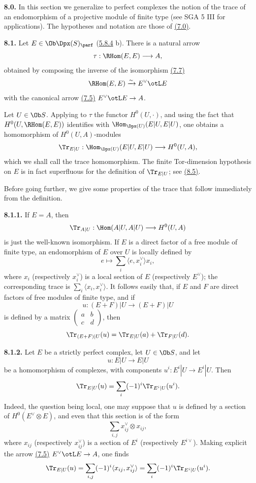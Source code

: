\textbf{8.0.} In this section we generalize to perfect complexes the notion of the trace of an endomorphism of a projective module of finite type (see SGA 5 III for applications). The hypotheses and notation are those of \hyperlink{sga6.e01.para.7-0}{(7.0)}.

\textbf{8.1.} Let \(E\in\Ob\Dpx(S)_{\parf}\) (\hyperlink{sga6.e01.rem.5-8-4}{5.8.4} b). There is a natural arrow
\[
  \tau:\RHom(E,E)\longrightarrow A,
\]
obtained by composing the inverse of the isomorphism \hyperlink{sga6.e01.cor.7-7}{(7.7)}
\[
  \RHom(E,E)\xrightarrow{\sim}E^\vee\otL E
\]
with the canonical arrow \hyperlink{sga6.e01.lem.7-5}{(7.5)} \(E^\vee\otL E\to A\).

Let \(U\in\Ob S\). Applying to \(\tau\) the functor \(H^0(U,\cdot)\), and using the fact that \(H^0(U,\RHom(E,E))\) identifies with \(\Hom_{\Dpx(U)}(E|U,E|U)\), one obtains a homomorphism of \(H^0(U,A)\)-modules
\[
  \Tr_{E|U}:\Hom_{\Dpx(U)}(E|U,E|U)\longrightarrow H^0(U,A),
\]
which we shall call the trace homomorphism. The finite Tor-dimension hypothesis on \(E\) is in fact superfluous for the definition of \(\Tr_{E|U}\); see \hyperlink{sga6.e01.rem.8-5}{(8.5)}.

Before going further, we give some properties of the trace that follow immediately from the definition.

\textbf{8.1.1.} If \(E=A\), then
\[
  \Tr_{A|U}:\Hom(A|U,A|U)\longrightarrow H^0(U,A)
\]
is just the well-known isomorphism. If \(E\) is a direct factor of a free module of finite type, an endomorphism of \(E\) over \(U\) is locally defined by
\[
  e\longmapsto \sum_i\langle e,x_i^\vee\rangle x_i,
\]
where \(x_i\) (respectively \(x_i^\vee\)) is a local section of \(E\) (respectively \(E^\vee\)); the corresponding trace is \(\sum_i\langle x_i,x_i^\vee\rangle\). It follows easily that, if \(E\) and \(F\) are direct factors of free modules of finite type, and if
\[
  u:(E+F)|U\longrightarrow(E+F)|U
\]
is defined by a matrix \(\begin{pmatrix}a&b\\ c&d\end{pmatrix}\), then
\[
  \Tr_{(E+F)|U}(u)=\Tr_{E|U}(a)+\Tr_{F|U}(d).
\]

\textbf{8.1.2.} Let \(E\) be a strictly perfect complex, let \(U\in\Ob S\), and let
\[
  u:E|U\longrightarrow E|U
\]
be a homomorphism of complexes, with components \(u^i:E^i|U\to E^i|U\). Then
\[
  \Tr_{E|U}(u)=\sum_i(-1)^i\Tr_{E^i|U}(u^i).
\]
Indeed, the question being local, one may suppose that \(u\) is defined by a section of \(H^0(E^\vee\otimes E)\), and even that this section is of the form
\[
  \sum_{i,j}x_{ij}^\vee\otimes x_{ij},
\]
where \(x_{ij}\) (respectively \(x_{ij}^\vee\)) is a section of \(E^i\) (respectively \(E^{i\vee}\)). Making explicit the arrow \hyperlink{sga6.e01.lem.7-5}{(7.5)} \(E^\vee\otL E\to A\), one finds
\[
  \Tr_{E|U}(u)=\sum_{i,j}(-1)^i\langle x_{ij},x_{ij}^\vee\rangle
  =\sum_i(-1)^i\Tr_{E^i|U}(u^i).
\]


